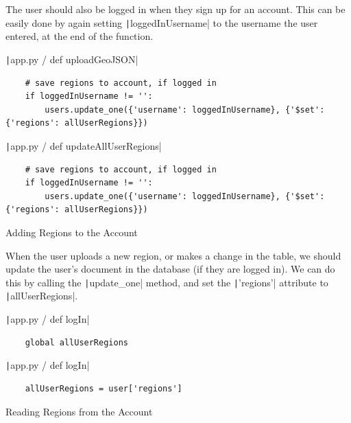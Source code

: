 \documentclass[12pt]{report}
\newcommand{\pil}[1]{\protect\texttt|#1|}
\begin{document}
The user should also be logged in when they sign up for an account. This can be easily done by again setting \pil{loggedInUsername} to the username the user entered, at the end of the function.

\begin{center}
\end{center}

\begin{listing}[H]
\pil{app.py / def uploadGeoJSON}
\begin{verbatim}
    # save regions to account, if logged in
    if loggedInUsername != '':
        users.update_one({'username': loggedInUsername}, {'$set': {'regions': allUserRegions}})
\end{verbatim}
\pil{app.py / def updateAllUserRegions}
\begin{verbatim}
    # save regions to account, if logged in
    if loggedInUsername != '':
        users.update_one({'username': loggedInUsername}, {'$set': {'regions': allUserRegions}})
\end{verbatim}
\caption{Adding Regions to the Account}\label{cs:regionsIntoAccount}
\end{listing}

When the user uploads a new region, or makes a change in the table, we should update the user's document in the database (if they are logged in). We can do this by calling the \pil{update_one} method, and set the \pil{'regions'} attribute to \pil{allUserRegions}.

\begin{listing}[H]
\pil{app.py / def logIn}
\begin{verbatim}
    global allUserRegions
\end{verbatim}
\pil{app.py / def logIn}
\begin{verbatim}
    allUserRegions = user['regions']
\end{verbatim}
\caption{Reading Regions from the Account}\label{cs:regionsOutOfAccount}
\end{listing}
\end{document}
